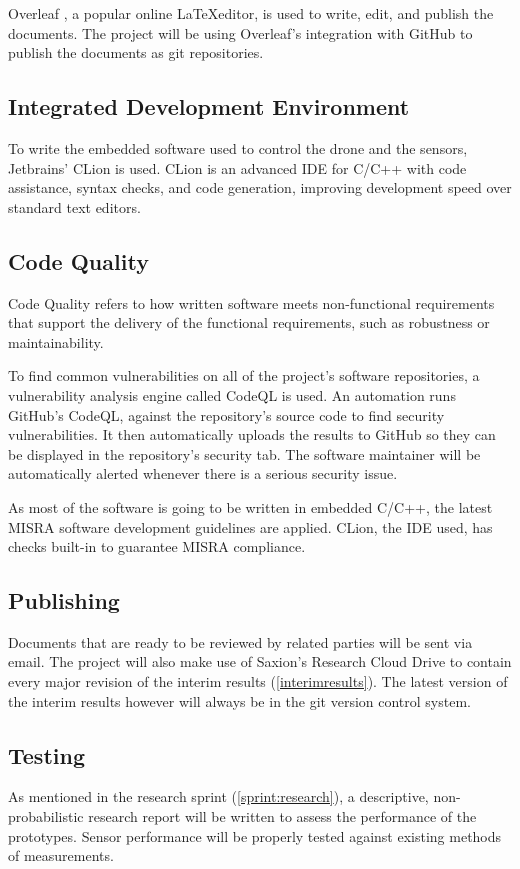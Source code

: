 \documentclass[11pt, a4paper]{article}
\begin{document}
Overleaf \cite{overleaf}, a popular online \LaTeX editor, is used to write, edit, and publish the documents. The project will be using Overleaf's integration with GitHub to publish the documents as git repositories.

\subsection{Integrated Development Environment}
To write the embedded software used to control the drone and the sensors, Jetbrains' CLion \cite{clion} is used. CLion is an advanced IDE for C/C++ with code assistance, syntax checks, and code generation, improving development speed over standard text editors.

\subsection{Code Quality}
Code Quality refers to how written software meets non-functional requirements that support the delivery of the functional requirements, such as robustness or maintainability. 

To find common vulnerabilities on all of the project's software repositories, a vulnerability analysis engine called CodeQL is used. An automation \cite{codeql} runs GitHub's CodeQL, against the repository's source code to find security vulnerabilities. It then automatically uploads the results to GitHub so they can be displayed in the repository's security tab. The software maintainer will be automatically alerted whenever there is a serious security issue.

As most of the software is going to be written in embedded C/C++, the latest MISRA  software development guidelines \cite{misra} are applied. CLion, the IDE used, has checks built-in to guarantee MISRA compliance. \cite{clion:misra}

\subsection{Publishing}
Documents that are ready to be reviewed by related parties will be sent via email. The project will also make use of Saxion's Research Cloud Drive \cite{saxrcd} to contain every major revision of the interim results (\ref{interimresults}). The latest version of the interim results however will always be in the git version control system.

\subsection{Testing}
As mentioned in the research sprint (\ref{sprint:research}), a descriptive, non-probabilistic research report will be written to assess the performance of the prototypes. Sensor performance will be properly tested against existing methods of measurements.
\end{document}
